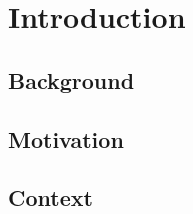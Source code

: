 \section{Introduction} \label{sec:Intro}

  \subsection{Background} \label{ssec:background}

    \blindtext

  \subsection{Motivation} \label{ssec:motivation}

    \blindtext

  \subsection{Context} \label{ssec:context}

    \blindtext
